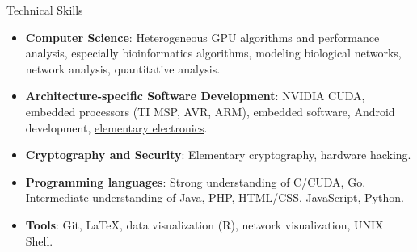 \documentclass[11pt,oneside]{article}
\newenvironment{ressection}[1]{
	\vspace{4pt}
	{\textbf\selectfont\Large\fontspec{Roboto-Thin.ttf}\textcolor{Sepia}{#1}}
	\begin{itemize}[topsep=6pt]
	\vspace{0pt}
}{
	\end{itemize}
}
\newcommand{\resitem}[1]{
	\vspace{-4pt}
	\item \begin{flushleft} #1 \end{flushleft}
}
\newenvironment{reslist}[1]{
	\resitem{\textbf{#1}}
	\vspace{-5pt}
	\begin{itemize}
}{
	\end{itemize}
}
\begin{document}







\begin{ressection}{Technical Skills}
		
        \resitem{\textbf{Computer Science}: Heterogeneous GPU algorithms and performance analysis, especially bioinformatics algorithms, modeling biological networks, network analysis, quantitative analysis.}

        \resitem{\textbf{Architecture-specific Software Development}: NVIDIA CUDA, embedded processors (TI MSP, AVR, ARM), embedded software, Android development, \href{https://verify.edxonline.org/cert/e8322a7ae5cb463496f1ab2414c19596}{elementary electronics}.}
	
	    \resitem{\textbf{Cryptography and Security}: Elementary cryptography, hardware hacking.}
	

		\resitem{\textbf{Programming languages}: Strong understanding of C/CUDA, Go. Intermediate understanding of Java, PHP, HTML/CSS, JavaScript, Python.}
		
		\resitem{\textbf{Tools}: Git, LaTeX, data visualization (R), network visualization, UNIX Shell.}

		

\end{ressection}
\vspace{8 pt}
\end{document}

